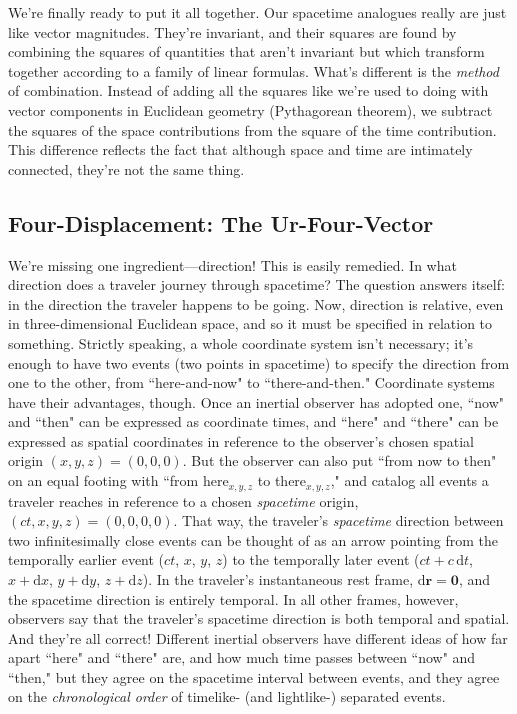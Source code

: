 \documentclass[12pt]{article}
\renewcommand{\vv}[1]{\mathbf{#1}}
\newcommand{\dd}[1]{\mathrm{d}#1}
\begin{document}
We're finally ready to put it all together. Our spacetime analogues really are just like vector magnitudes. They're invariant, and their squares are found by combining the squares of quantities that aren't invariant but which transform together according to a family of linear formulas. What's different is the \emph{method} of combination. Instead of adding all the squares like we're used to doing with vector components in Euclidean geometry (Pythagorean theorem), we subtract the squares of the space contributions from the square of the time contribution. This difference reflects the fact that although space and time are intimately connected, they're not the same thing.


\subsection{Four-Displacement: The Ur-Four-Vector}\label{ssec:fd}

We're missing one ingredient---direction! This is easily remedied. In what direction does a traveler journey through spacetime? The question answers itself: in the direction the traveler happens to be going. Now, direction is relative, even in three-dimensional Euclidean space, and so it must be specified in relation to something. Strictly speaking, a whole coordinate system isn't necessary; it's enough to have two events (two points in spacetime) to specify the direction from one to the other, from ``here-and-now" to ``there-and-then." Coordinate systems have their advantages, though. Once an inertial observer has adopted one, ``now" and ``then" can be expressed as coordinate times, and ``here" and ``there" can be expressed as spatial coordinates in reference to the observer's chosen spatial origin $(x,y,z)=(0,0,0)$. But the observer can also put ``from now to then" on an equal footing with ``from here$_{x, y, z}$ to there$_{x, y, z}$," and catalog all events a traveler reaches in reference to a chosen \emph{spacetime} origin, $(ct,x,y,z)=(0,0,0,0)$. That way, the traveler's \emph{spacetime} direction between two infinitesimally close events can be thought of as an arrow pointing from the temporally earlier event ($ct$, $x$, $y$, $z$) to the temporally later event ($ct + c \, \dd t$, $x + \dd x$, $y + \dd y$, $z + \dd z$). In the traveler's instantaneous rest frame, $\dd \vv r = \vv 0$, and the spacetime direction is entirely temporal. In all other frames, however, observers say that the traveler's spacetime direction is both temporal and spatial. And they're all correct! Different inertial observers have different ideas of how far apart ``here" and ``there" are, and how much time passes between ``now" and ``then," but they agree on the spacetime interval between events, and they agree on the \emph{chronological order} of timelike- (and lightlike-) separated events.
\end{document}
